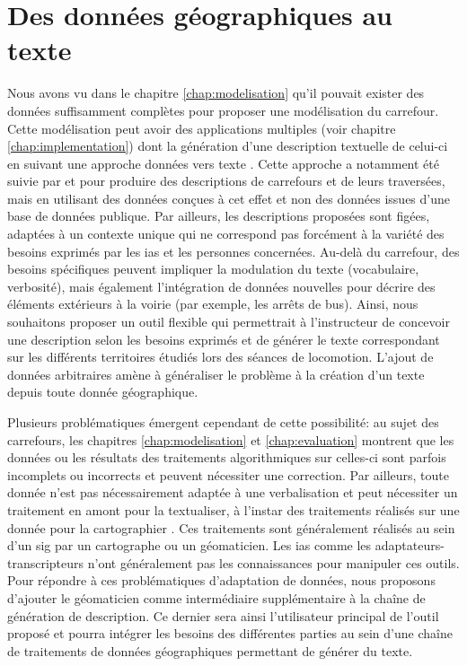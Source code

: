 \section{Des données géographiques au texte}

\label{sec:description_geodata_to_text}

Nous avons vu dans le chapitre \ref{chap:modelisation} qu’il pouvait exister des données suffisamment complètes pour proposer une modélisation du carrefour. Cette modélisation peut avoir des applications multiples (voir chapitre \ref{chap:implementation}) dont la génération d’une description textuelle de celui-ci en suivant une approche données vers texte \citep{reiter-2007-architecture}. Cette approche a notamment été suivie par \citet{Guth2019} et \citet{balata2018} pour produire des descriptions de carrefours et de leurs traversées, mais en utilisant des données conçues à cet effet et non des données issues d’une base de données publique. Par ailleurs, les descriptions proposées sont figées, adaptées à un contexte unique qui ne correspond pas forcément à la variété des besoins exprimés par les \glspl{ia} et les personnes concernées. Au-delà du carrefour, des besoins spécifiques peuvent impliquer la modulation du texte (vocabulaire, verbosité), mais également l’intégration de données nouvelles pour décrire des éléments extérieurs à la voirie (par exemple, les arrêts de bus). Ainsi, nous souhaitons proposer un outil flexible qui permettrait à l’instructeur de concevoir une description selon les besoins exprimés et de générer le texte correspondant sur les différents territoires étudiés lors des séances de locomotion. L’ajout de données arbitraires amène à généraliser le problème à la création d’un texte depuis toute donnée géographique.

\newpar{}

Plusieurs problématiques émergent cependant de cette possibilité: au sujet des carrefours, les chapitres \ref{chap:modelisation} et \ref{chap:evaluation} montrent que les données ou les résultats des traitements algorithmiques sur celles-ci sont parfois incomplets ou incorrects et peuvent nécessiter une correction. Par ailleurs, toute donnée n’est pas nécessairement adaptée à une verbalisation et peut nécessiter un traitement en amont pour la textualiser, à l’instar des traitements réalisés sur une donnée pour la cartographier \citep{mackaness2002}. Ces traitements sont généralement réalisés au sein d’un \gls{sig} par un cartographe ou un géomaticien. Les \glspl{ia} comme les adaptateurs-transcripteurs n’ont généralement pas les connaissances pour manipuler ces outils. Pour répondre à ces problématiques d'adaptation de données, nous proposons d’ajouter le géomaticien comme intermédiaire supplémentaire à la chaîne de génération de description. Ce dernier sera ainsi l’utilisateur principal de l’outil proposé et pourra intégrer les besoins des différentes parties au sein d’une chaîne de traitements de données géographiques permettant de générer du texte.

